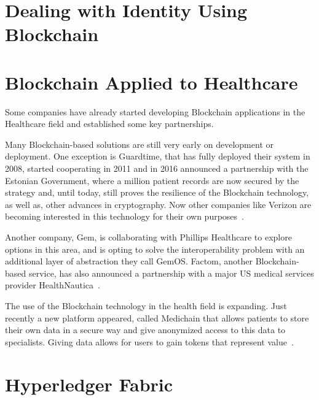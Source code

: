 
\section{Dealing with Identity Using Blockchain}

\section{Blockchain Applied to Healthcare}

Some companies have already started developing Blockchain applications in the
Healthcare field and established some key partnerships.

Many Blockchain-based solutions are still very early on development or
deployment.  One exception is Guardtime, that has fully deployed their system
in 2008, started cooperating in 2011 and in 2016 announced a partnership with
the Estonian Government, where a million patient records are now secured by the
strategy and, until today, still proves the resilience of the Blockchain
technology, as well as, other advances in cryptography.  Now other companies
like Verizon are becoming interested in this technology for their own
purposes~\cite{GuardTime2018,EstonianGovernmentGuardTime2016}.

Another company, Gem, is collaborating with Phillips Healthcare to explore
options in this area, and is opting to solve the interoperability problem with
an additional layer of abstraction they call GemOS.  Factom, another
Blockchain-based service, has also announced a partnership with a major US
medical services provider
HealthNautica~\cite{BlockchainCompHealth2017,FactomPartnership2017}.

The use of the Blockchain technology in the health field is expanding. Just
recently a new platform appeared, called Medichain that allows patients to
store their own data in a secure way and give anonymized access to this data to
specialists. Giving data allows for users to gain tokens that represent
value~\cite{MediChain2018}.

\section{Hyperledger Fabric}
